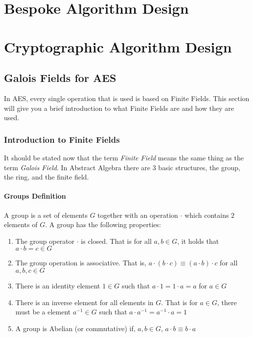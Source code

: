 \section{Bespoke Algorithm Design}

\section{Cryptographic Algorithm Design}

\subsection{Galois Fields for AES}

In AES, every single operation that is used is based on Finite Fields. This section will give you a brief introduction to what Finite Fields are and how they are used.

\subsubsection{Introduction to Finite Fields}

It should be stated now that the term \textit{Finite Field} means the same thing as the term \textit{Galois Field}. In Abstract Algebra there are 3 basic structures, the group, the ring, and the finite field.

\paragraph{Groups Definition}
A group is a set of elements $G$ together with an operation $\cdot$ which contains $2$ elements of $G$. A group has the following properties:
\begin{enumerate}
\item{The group operator $\cdot$ is closed. That is for all $a,b \in G$, it holds that $a \cdot b = c \in G$}
\item{The group operation is associative. That is, $a \cdot (b \cdot c) \equiv (a \cdot b) \cdot c$ for all $a,b,c \in G$}
\item{There is an identity element $1 \in G$ such that $a \cdot 1 = 1 \cdot a = a$ for $a \in G$}
\item{There is an inverse element for all elements in $G$. That is for $a \in G$, there must be a element $a^{-1} \in G$ such that $a \cdot a^{-1} = a^{-1} \cdot a = 1$}
\item{A group is Abelian (or commutative) if, $a,b \in G$, $a \cdot b \equiv b \cdot a$}
\end{enumerate}

